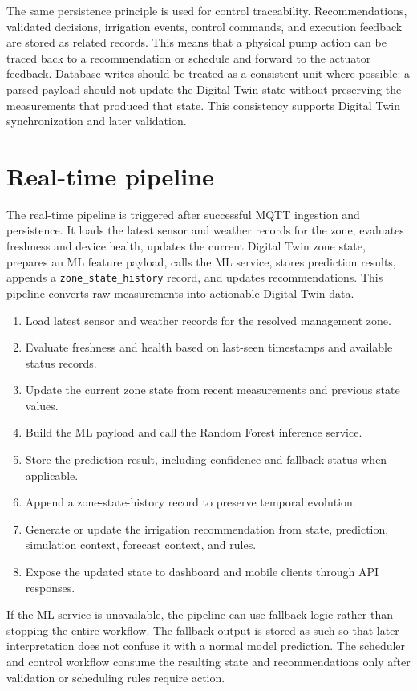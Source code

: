 The same persistence principle is used for control traceability. Recommendations, validated decisions, irrigation events, control commands, and execution feedback are stored as related records. This means that a physical pump action can be traced back to a recommendation or schedule and forward to the actuator feedback. Database writes should be treated as a consistent unit where possible: a parsed payload should not update the Digital Twin state without preserving the measurements that produced that state. This consistency supports Digital Twin synchronization and later validation.

\section{Real-time pipeline}

The real-time pipeline is triggered after successful MQTT ingestion and persistence. It loads the latest sensor and weather records for the zone, evaluates freshness and device health, updates the current Digital Twin zone state, prepares an ML feature payload, calls the ML service, stores prediction results, appends a \texttt{zone\_state\_history} record, and updates recommendations. This pipeline converts raw measurements into actionable Digital Twin data.

\begin{enumerate}
\item Load latest sensor and weather records for the resolved management zone.
\item Evaluate freshness and health based on last-seen timestamps and available status records.
\item Update the current zone state from recent measurements and previous state values.
\item Build the ML payload and call the Random Forest inference service.
\item Store the prediction result, including confidence and fallback status when applicable.
\item Append a zone-state-history record to preserve temporal evolution.
\item Generate or update the irrigation recommendation from state, prediction, simulation context, forecast context, and rules.
\item Expose the updated state to dashboard and mobile clients through API responses.
\end{enumerate}

If the ML service is unavailable, the pipeline can use fallback logic rather than stopping the entire workflow. The fallback output is stored as such so that later interpretation does not confuse it with a normal model prediction. The scheduler and control workflow consume the resulting state and recommendations only after validation or scheduling rules require action.

